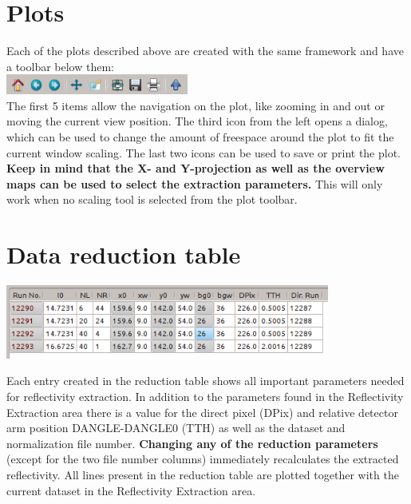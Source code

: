 \section{Plots}
  Each of the plots described above are created with the same framework and have a toolbar below them:\\
  \includegraphics[width=6cm]{screenshots/plottoolbar.png}\\
  The first 5 items allow the navigation on the plot, like zooming in and out or moving the current view position.
  The third icon from the left opens a dialog, which can be used to change the amount of freespace around the plot to fit the current window scaling.
  The last two icons can be used to save or print the plot.
  \textbf{Keep in mind that the X- and Y-projection as well as the overview maps can be used to select the extraction parameters.}
  This will only work when no scaling tool is selected from the plot toolbar.

\section{Data reduction table}
  \includegraphics[width=0.8\textwidth]{screenshots/reductiontable.png}

  Each entry created in the reduction table shows all important parameters needed for reflectivity extraction.
  In addition to the parameters found in the Reflectivity Extraction area there is a value for the direct pixel (DPix) and relative detector arm position DANGLE-DANGLE0 (TTH) as well as the dataset and normalization file number.
  \textbf{Changing any of the reduction parameters} (except for the two file number columns) immediately recalculates the extracted reflectivity.
  All lines present in the reduction table are plotted together with the current dataset in the Reflectivity Extraction area.

